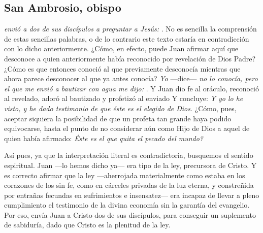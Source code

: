 \subsection{San Ambrosio, obispo}



\begin{body}
	 \emph{envió a dos de sus discípulos a preguntar a Jesús: }. No es sencilla la comprensión de estas sencillas palabras, o de lo contrario este texto estaría en contradicción con lo dicho anteriormente. ¿Cómo, en efecto, puede Juan afirmar aquí que desconoce a quien anteriormente había reconocido por revelación de Dios Padre? ¿Cómo es que entonces conoció al que previamente desconocía mientras que ahora parece desconocer al que ya antes conocía? \emph{Yo} ---dice--- \emph{no lo conocía, pero el que me envió a bautizar con agua me dijo: }. Y Juan dio fe al oráculo, reconoció al revelado, adoró al bautizado y profetizó al enviado Y concluye: \emph{Y yo lo he visto, y he dado testimonio de que éste es el elegido de Dios}. ¿Cómo, pues, aceptar siquiera la posibilidad de que un profeta tan grande haya podido equivocarse, hasta el punto de no considerar aún como Hijo de Dios a aquel de quien había afirmado: \emph{Éste es el que quita el pecado del mundo?} 
	
	Así pues, ya que la interpretación literal es contradictoria, busquemos el sentido espiritual. Juan ---lo hemos dicho ya--- era tipo de la ley, precursora de Cristo. Y es correcto afirmar que la ley ---aherrojada materialmente como estaba en los corazones de los sin fe, como en cárceles privadas de la luz eterna, y constreñida por entrañas fecundas en sufrimientos e insensatez--- era incapaz de llevar a pleno cumplimiento el testimonio de la divina economía sin la garantía del evangelio. Por eso, envía Juan a Cristo dos de sus discípulos, para conseguir un suplemento de sabiduría, dado que Cristo es la plenitud de la ley. 
	

\end{body}
